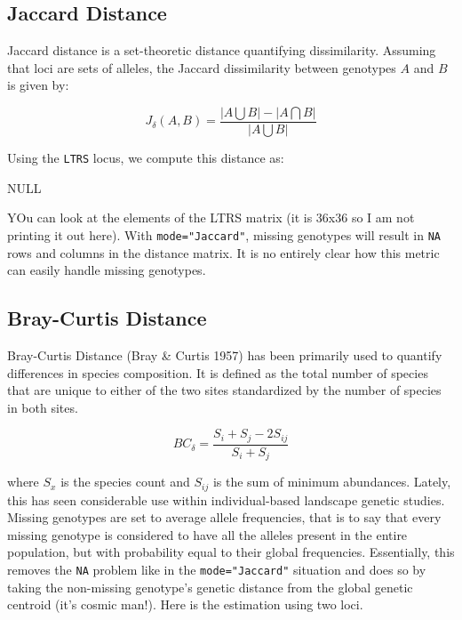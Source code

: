 \documentclass[letterpaper,twoside,openany]{book}
\begin{document}
\subsection{Jaccard Distance}

Jaccard distance is a set-theoretic distance quantifying dissimilarity.  Assuming that loci are sets of alleles, the Jaccard dissimilarity between genotypes $A$ and $B$ is given by:

\begin{equation}
	J_\delta(A,B) = \frac{|A \bigcup B| - |A \bigcap B|}{|A \bigcup B|}
\end{equation}

Using the \texttt{LTRS} locus, we compute this distance as:

\begin{Schunk}
\begin{Soutput}
NULL
\end{Soutput}
\end{Schunk}

YOu can look at the elements of the LTRS matrix (it is 36x36 so I am not printing it out here).  With \texttt{mode="Jaccard"}, missing genotypes will result in \texttt{NA} rows and columns in the distance matrix.  It is no entirely clear how this metric can easily handle missing genotypes.

\subsection{Bray-Curtis Distance}

Bray-Curtis Distance (Bray \& Curtis 1957) has been primarily used to quantify differences in species composition.  It is defined as the total number of species that are unique to either of the two sites standardized by the number of species in both sites.  

\begin{equation}
	BC_\delta = \frac{S_i + S_j - 2S_{ij}}{S_i+S_j}
\end{equation}

where $S_x$ is the species count and $S_{ij}$ is the sum of minimum abundances.  Lately, this has seen considerable use within individual-based landscape genetic studies.  Missing genotypes are set to average allele frequencies, that is to say that every missing genotype is considered to have all the alleles present in the entire population, but with probability equal to their global frequencies.  Essentially, this removes the \texttt{NA} problem like in the \texttt{mode="Jaccard"} situation and does so by taking the non-missing genotype's genetic distance from the global genetic centroid (it's cosmic man!).  Here is the estimation using two loci.
\end{document}

